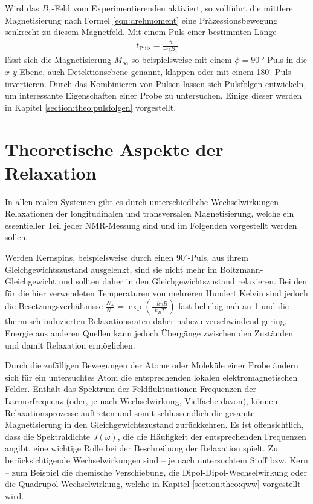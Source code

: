 Wird das $B_1$-Feld vom Experimentierenden aktiviert, so vollführt die mittlere Magnetisierung nach Formel \eqref{eqn:drehmoment} eine Präzessionsbewegung senkrecht zu diesem Magnetfeld. Mit einem Puls einer bestimmten Länge
\begin{align}
	t_\text{Puls} = \frac{\phi}{- \gamma B_1} \label{eqn:theo:pulslaenge}
\end{align}
lässt sich die Magnetisierung $M_\infty$ so beispielsweise mit einem $\phi = \SI{90}{\degree}$-Puls in die $x$-$y$-Ebene, auch Detektionsebene genannt, klappen oder mit einem 180$^\circ$-Puls invertieren. Durch das Kombinieren von Pulsen lassen sich Pulsfolgen entwickeln, um interessante Eigenschaften einer Probe zu untersuchen. Einige dieser werden in Kapitel \ref{section:theo:pulsfolgen} vorgestellt.



\section{Theoretische Aspekte der Relaxation} \label{section:theo:relax}

In allen realen Systemen gibt es durch unterschiedliche Wechselwirkungen Relaxationen der longitudinalen und transversalen Magnetisierung, welche ein essentieller Teil jeder NMR-Messung sind und im Folgenden vorgestellt werden sollen.

Werden Kernspins, beispielsweise durch einen 90$^\circ$-Puls, aus ihrem Gleichgewichtszustand ausgelenkt, sind sie nicht mehr im Boltzmann-Gleichgewicht und sollten daher in den Gleichgewichtszustand relaxieren. Bei den für die hier verwendeten Temperaturen von mehreren Hundert Kelvin sind jedoch die Besetzungsverhältnisse $\frac{N_+}{N_-} = \exp (\frac{- \hbar \gamma B}{k_B T})$ fast beliebig nah an 1 und die thermisch induzierten Relaxationsraten daher nahezu verschwindend gering. Energie aus anderen Quellen kann jedoch Übergänge zwischen den Zuständen und damit Relaxation ermöglichen.

Durch die zufälligen Bewegungen der Atome oder Moleküle einer Probe ändern sich für ein untersuchtes Atom die entsprechenden lokalen elektromagnetischen Felder. Enthält das Spektrum der Feldfluktuationen Frequenzen der Larmorfrequenz (oder, je nach Wechselwirkung, Vielfache davon), können Relaxationsprozesse auftreten und somit schlussendlich die gesamte Magnetisierung in den Gleichgewichtszustand zurückkehren. Es ist offensichtlich, dass die Spektraldichte $J(\omega)$, die die Häufigkeit der entsprechenden Frequenzen angibt, eine wichtige Rolle bei der Beschreibung der Relaxation spielt. Zu berücksichtigende Wechselwirkungen sind -- je nach untersuchtem Stoff bzw. Kern -- zum Beispiel die chemische Verschiebung, die Dipol-Dipol-Wechselwirkung oder die Quadrupol-Wechselwirkung, welche in Kapitel \ref{section:theo:qww} vorgestellt wird.

